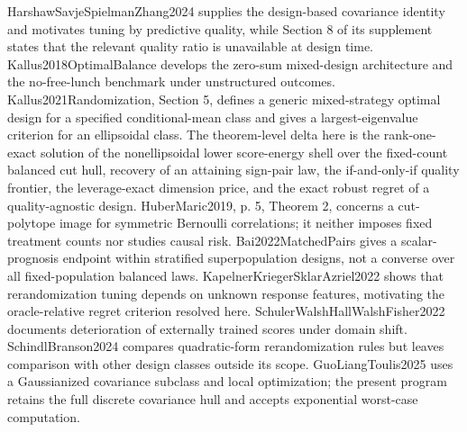 HarshawSavjeSpielmanZhang2024 supplies the design-based covariance identity and motivates tuning by predictive quality, while Section 8 of its supplement states that the relevant quality ratio is unavailable at design time. Kallus2018OptimalBalance develops the zero-sum mixed-design architecture and the no-free-lunch benchmark under unstructured outcomes. Kallus2021Randomization, Section 5, defines a generic mixed-strategy optimal design for a specified conditional-mean class and gives a largest-eigenvalue criterion for an ellipsoidal class. The theorem-level delta here is the rank-one-exact solution of the nonellipsoidal lower score-energy shell over the fixed-count balanced cut hull, recovery of an attaining sign-pair law, the if-and-only-if quality frontier, the leverage-exact dimension price, and the exact robust regret of a quality-agnostic design. HuberMaric2019, p. 5, Theorem 2, concerns a cut-polytope image for symmetric Bernoulli correlations; it neither imposes fixed treatment counts nor studies causal risk. Bai2022MatchedPairs gives a scalar-prognosis endpoint within stratified superpopulation designs, not a converse over all fixed-population balanced laws. KapelnerKriegerSklarAzriel2022 shows that rerandomization tuning depends on unknown response features, motivating the oracle-relative regret criterion resolved here. SchulerWalshHallWalshFisher2022 documents deterioration of externally trained scores under domain shift. SchindlBranson2024 compares quadratic-form rerandomization rules but leaves comparison with other design classes outside its scope. GuoLiangToulis2025 uses a Gaussianized covariance subclass and local optimization; the present program retains the full discrete covariance hull and accepts exponential worst-case computation.
